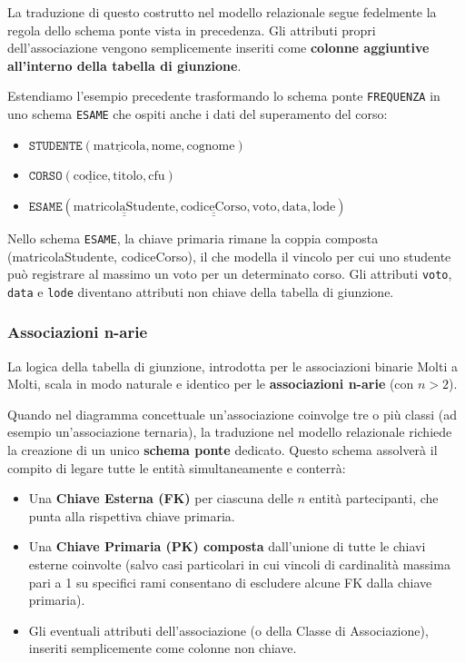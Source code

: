 La traduzione di questo costrutto nel modello relazionale segue fedelmente la regola dello schema ponte vista in precedenza. Gli attributi propri dell'associazione vengono semplicemente inseriti come \textbf{colonne aggiuntive all'interno della tabella di giunzione}.

\begin{example}
Estendiamo l'esempio precedente trasformando lo schema ponte \texttt{FREQUENZA} in uno schema \texttt{ESAME} che ospiti anche i dati del superamento del corso:

\begin{itemize}
    \item $\texttt{STUDENTE}(\underline{\text{matricola}}, \text{nome}, \text{cognome})$
    \item $\texttt{CORSO}(\underline{\text{codice}}, \text{titolo}, \text{cfu})$
    \item $\texttt{ESAME}(\underline{\underline{\text{matricolaStudente}}}, \underline{\underline{\text{codiceCorso}}}, \text{voto}, \text{data}, \text{lode})$
\end{itemize}

\medskip

Nello schema \texttt{ESAME}, la chiave primaria rimane la coppia composta (matricolaStudente, codiceCorso), il che modella il vincolo per cui uno studente può registrare al massimo un voto per un determinato corso. Gli attributi \texttt{voto}, \texttt{data} e \texttt{lode} diventano attributi non chiave della tabella di giunzione.
\end{example}

\subsubsection{Associazioni n-arie}

La logica della tabella di giunzione, introdotta per le associazioni binarie Molti a Molti, scala in modo naturale e identico per le \textbf{associazioni n-arie} (con $n > 2$). 

Quando nel diagramma concettuale un'associazione coinvolge tre o più classi (ad esempio un'associazione ternaria), la traduzione nel modello relazionale richiede la creazione di un unico \textbf{schema ponte} dedicato. Questo schema assolverà il compito di legare tutte le entità simultaneamente e conterrà:
\begin{itemize}
    \item Una \textbf{Chiave Esterna (FK)} per ciascuna delle $n$ entità partecipanti, che punta alla rispettiva chiave primaria.
    \item Una \textbf{Chiave Primaria (PK) composta} dall'unione di tutte le chiavi esterne coinvolte (salvo casi particolari in cui vincoli di cardinalità massima pari a 1 su specifici rami consentano di escludere alcune FK dalla chiave primaria).
    \item Gli eventuali attributi dell'associazione (o della Classe di Associazione), inseriti semplicemente come colonne non chiave.
\end{itemize}

